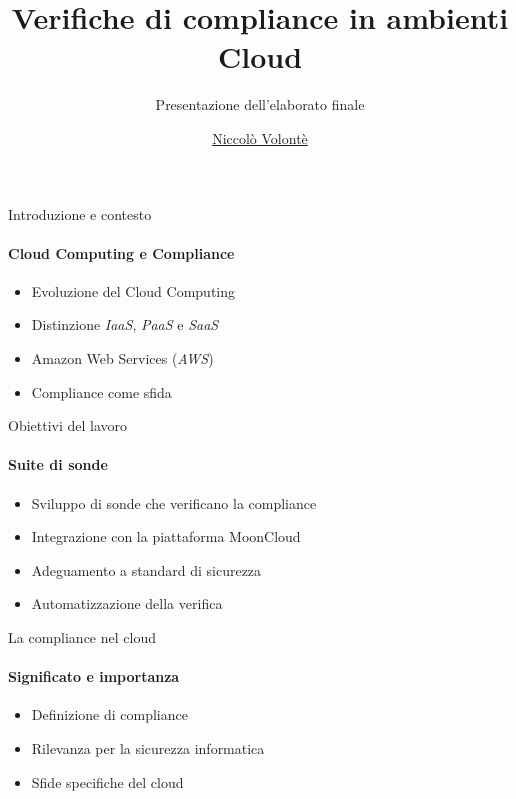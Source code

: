\documentclass{beamer}
\title{Verifiche di compliance in ambienti Cloud}
\subtitle{Presentazione dell'elaborato finale}
\author{\href{mailto:niccolo.volonte@studenti.unimi.it}{Niccolò Volontè}}
\begin{document}
\maketitle




\begin{frame}{Introduzione e contesto}
    \framesubtitle{Cloud Computing e Compliance}
    \begin{itemize}
        \item Evoluzione del Cloud Computing
        \item Distinzione \emph{IaaS}, \emph{PaaS} e \emph{SaaS}
        \item Amazon Web Services (\emph{AWS}) 
        \item Compliance come sfida
    \end{itemize}
\end{frame}

\begin{frame}{Obiettivi del lavoro}
    \framesubtitle{Suite di sonde}
    \begin{itemize}
        \item Sviluppo di sonde che verificano la compliance
        \item Integrazione con la piattaforma MoonCloud
        \item Adeguamento a standard di sicurezza
        \item Automatizzazione della verifica
    \end{itemize}
\end{frame}

\begin{frame}{La compliance nel cloud}
    \framesubtitle{Significato e importanza}
    \begin{itemize}
        \item Definizione di compliance
        \item Rilevanza per la sicurezza informatica
        \item Sfide specifiche del cloud
    \end{itemize}
\end{frame}
\end{document}
